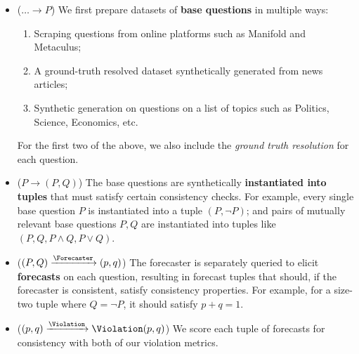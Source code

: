 \begin{itemize}
    \item ($\dots\longrightarrow P$) We first prepare datasets of \textbf{base questions} in multiple ways:
    \begin{enumerate}[label=(\alph*)]
        \item Scraping questions from online platforms such as Manifold and Metaculus;
        \item A ground-truth resolved dataset synthetically generated from news articles;
        \item Synthetic generation on questions on a list of topics such as Politics, Science, Economics, etc.
    \end{enumerate}
    For the first two of the above, we also include the \emph{ground truth resolution} for each question.
    \item ($P\longrightarrow (P, Q)$) The base questions are synthetically \textbf{instantiated into tuples} that must satisfy certain consistency checks. For example, every single base question $P$ is instantiated into a tuple $(P,\lnot P)$; and pairs of mutually relevant base questions $P,Q$ are instantiated into tuples like $(P,Q,P\land Q,P\lor Q)$. %
    \item ($(P,Q)\xrightarrow{\Forecaster}(p,q)$) The forecaster is separately queried to elicit \textbf{forecasts} on each question, resulting in forecast tuples that should, if the forecaster is consistent, satisfy consistency properties.  For example, for a size-two tuple where $Q = \neg P$, it should satisfy $p+q=1$.
    \item ($(p,q)\xrightarrow{\Violation}\Violation(p,q)$) We score each tuple of forecasts for consistency with both of our violation metrics.
\end{itemize}

